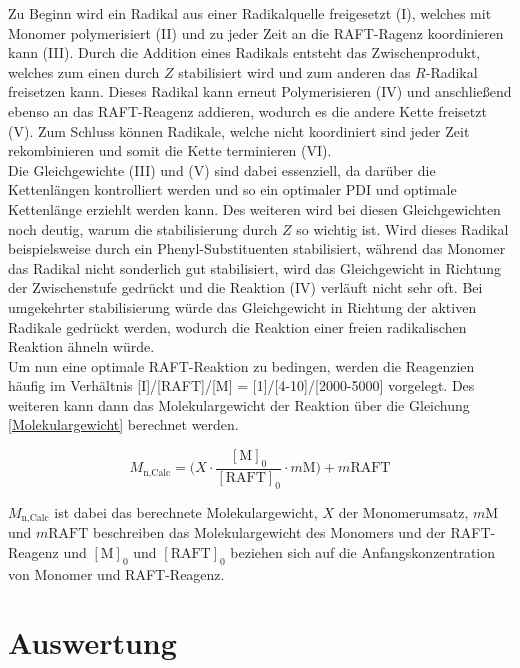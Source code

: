 \documentclass[10pt,a4paper,ngerman]{scrartcl}
\begin{document}
			Zu Beginn wird ein Radikal aus einer Radikalquelle freigesetzt (I), welches mit Monomer polymerisiert (II) und zu jeder Zeit an die RAFT-Ragenz koordinieren 
			kann (III). Durch die Addition eines Radikals entsteht das Zwischenprodukt, welches zum einen durch $Z$ stabilisiert wird und zum anderen das $R$-Radikal 
			freisetzen kann. Dieses Radikal kann erneut Polymerisieren (IV) und anschließend ebenso an das RAFT-Reagenz addieren, wodurch es die andere Kette freisetzt (V). 
			Zum Schluss können Radikale, welche nicht koordiniert sind jeder Zeit rekombinieren und somit die Kette terminieren (VI). \\
			Die Gleichgewichte (III) und (V) sind dabei essenziell, da darüber die Kettenlängen kontrolliert werden und so ein optimaler PDI und optimale Kettenlänge erziehlt 
			werden kann. Des weiteren wird bei diesen Gleichgewichten noch deutig, warum die stabilisierung durch $Z$ so wichtig ist. Wird dieses Radikal beispielsweise
			durch ein Phenyl-Substituenten stabilisiert, während das Monomer das Radikal nicht sonderlich gut stabilisiert, wird das Gleichgewicht in Richtung der 
			Zwischenstufe gedrückt und die Reaktion (IV) verläuft nicht sehr oft. Bei umgekehrter stabilisierung würde das Gleichgewicht in Richtung der aktiven Radikale 
			gedrückt werden, wodurch die Reaktion einer freien radikalischen Reaktion ähneln würde.\\
			Um nun eine optimale RAFT-Reaktion zu bedingen, werden die Reagenzien häufig im Verhältnis [I]/[RAFT]/[M] = [1]/[4-10]/[2000-5000] vorgelegt. Des weiteren kann 
			dann das Molekulargewicht der Reaktion über die Gleichung \eqref{Molekulargewicht} berechnet werden.

			\begin{equation}
				M_\text{n,Calc} = \bigl(X \cdot \frac{[\text{M}]_0}{[\text{RAFT}]_0} \cdot m\text{M}\bigr) + m\text{RAFT}
				\label{Molekulargewicht}
			\end{equation}

			$M_\text{n,Calc}$ ist dabei das berechnete Molekulargewicht, $X$ der Monomerumsatz, $m\text{M}$ und $m\text{RAFT}$ beschreiben das Molekulargewicht des Monomers
			und der RAFT-Reagenz und $[\text{M}]_0$ und $[\text{RAFT}]_0$ beziehen sich auf die Anfangskonzentration von Monomer und RAFT-Reagenz. \cite{polyskript}



\section{Auswertung}
\end{document}

